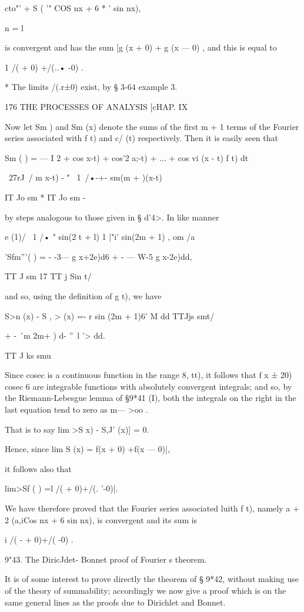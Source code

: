   cto"' + S ( '" COS nx + 6 * ' sin nx),

n = l

is convergent and has the sum [g (x + 0) + g (x — 0) , and this is
equal to

1 /( + 0) +/(..• -0) .

* The limits /(.r±0) exist, by § 3-64 example 3.

176 THE PROCESSES OF ANALYSIS [cHAP. IX

Now let Sm ) and Sm (x) denote the sums of the first m + 1 terms of
the Fourier series associated with f t) and c/ (t) respectively. Then
it is easily seen that

Sm ( ) = — I 2 + cos x-t) + cos'2 a;-t) + ... + cos vi (x - t) f t) dt

~27rJ\ / m x-t) - " \ 1\ /•-+- sm(m + )(x-t)

IT Jo sm * IT Jo sm -

by steps analogous to those given in § d'4>. In like manner

e (1)/ \ 1 /• " sin(2 t + l) 1 |"i' sin(2m + 1) , om /a

'Sfm'''( ) = - -3— g x+2e)d6 + - — W-5 g x-2e)dd,

TT J sm 17 TT j Sin t/

and so, using the definition of g t), we have

S>n (x) - S , > (x) =- r sin (2m + 1)6' M dd TTJjs smt/

+ - \'\ m 2m+ ) d- ''~l '> dd.

TT J ks smu

Since cosec is a continuous function in the range 8, tt), it follows
that f x ± 20) cosec 6 are integrable functions with absolutely
convergent integrals; and so, by the Riemann-Lebesgue lemma of §9*41
(I), both the integrals on the right in the last equation tend to zero
as m— >oo .

That is to say lim >S x) - S,J' (x)] = 0.

Hence, since lim S (x) = f(x + 0) +f(x — 0)|,

it follows also that

lim>Sf ( ) =l /( + 0)+/(. '-0)|.

We have therefore proved that the Fourier series associated luith f
t), namely a + 2 (a,iCos nx + 6 sin nx), is convergent and its sum is

i /( - + 0)+/( -0) .

9"43. The DiricJdet- Bonnet proof of Fourier s theorem.

It is of some interest to prove directly the theorem of § 9*42,
without making use of the theory of summability; accordingly we now
give a proof which is on the same general lines as the proofs due to
Dirichlet and Bonnet.

